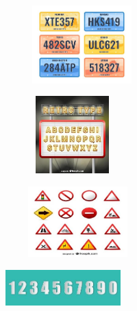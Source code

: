 


\begin{escolha}
\item \includegraphics[width=2.32569in,height=1.18472in]{media/image222.jpg}

\item \includegraphics[width=2.03125in,height=1.17361in]{media/image223.jpg}

\item \includegraphics[width=2.20764in,height=1.07569in]{media/image224.jpg}

\item \includegraphics[width=1.75000in,height=0.54792in]{media/image225.jpg}
\end{escolha}

